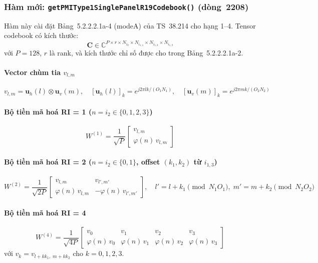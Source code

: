 \documentclass[11pt,a4paper]{article}
\begin{document}
\subsubsection{Hàm mới: \texttt{getPMIType1SinglePanelR19Codebook()} (dòng~2208)}

Hàm này cài đặt Bảng~5.2.2.2.1a-4 (modeA) của TS~38.214 cho hạng 1--4.
Tensor codebook có kích thước:
\begin{equation}
  \mathbf{C} \in \mathbb{C}^{P \times r \times N_{i_2} \times N_{i_{1,1}} \times N_{i_{1,2}} \times N_{i_{1,3}}}
\end{equation}
với $P=128$, $r$ là rank, và kích thước chỉ số được cho trong
Bảng~5.2.2.2.1a-2.

\paragraph{Vector chùm tia $v_{l,m}$}
\begin{equation}
  v_{l,m} = \mathbf{u}_h(l) \otimes \mathbf{u}_v(m), \quad
  [\mathbf{u}_h(l)]_k = e^{j2\pi l k / (O_1 N_1)}, \quad
  [\mathbf{u}_v(m)]_k = e^{j2\pi m k / (O_2 N_2)}
\end{equation}

\paragraph{Bộ tiền mã hoá RI = 1 ($n = i_2 \in \{0,1,2,3\}$)}
\begin{equation}
  W^{(1)} = \frac{1}{\sqrt{P}}
  \begin{bmatrix} v_{l,m} \\ \varphi(n)\,v_{l,m} \end{bmatrix}
\end{equation}

\paragraph{Bộ tiền mã hoá RI = 2 ($n = i_2 \in \{0,1\}$, offset $(k_1,k_2)$ từ $i_{1,3}$)}
\begin{equation}
  W^{(2)} = \frac{1}{\sqrt{2P}}
  \begin{bmatrix}
    v_{l,m} & v_{l',m'} \\
    \varphi(n)\,v_{l,m} & -\varphi(n)\,v_{l',m'}
  \end{bmatrix}, \quad
  l' = l+k_1 \pmod{N_1 O_1}, \; m' = m+k_2 \pmod{N_2 O_2}
\end{equation}

\paragraph{Bộ tiền mã hoá RI = 4}
\begin{equation}
  W^{(4)} = \frac{1}{\sqrt{4P}}
  \begin{bmatrix}
    v_0 & v_1 & v_2 & v_3 \\
    \varphi(n)\,v_0 & \varphi(n)\,v_1 & \varphi(n)\,v_2 & \varphi(n)\,v_3
  \end{bmatrix}
\end{equation}
với $v_k = v_{l+k k_1,\;m+k k_2}$ cho $k=0,1,2,3$.
\end{document}
